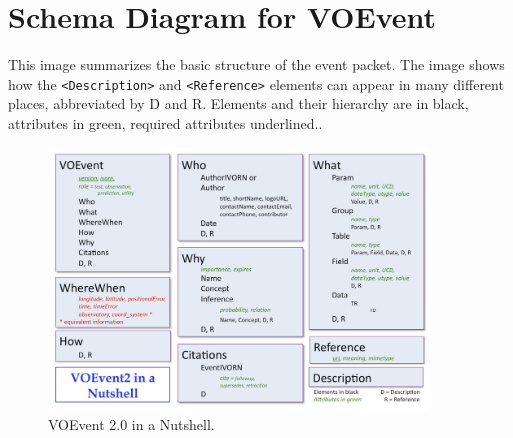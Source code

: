 \documentclass[11pt,a4paper]{ivoa}
\begin{document}
\section{Schema Diagram for VOEvent}
\label{sec:5}
This image summarizes the basic structure of the event packet. The image shows how the {\tt <Description>} and {\tt <Reference>} elements can appear in many different places, abbreviated by D and R. Elements and their hierarchy are in black, attributes in green, required attributes underlined.. 
\begin{figure}[th]
\begin{center}
\includegraphics[width=0.9\textwidth]{nutshell.png} \end{center}
\caption{VOEvent 2.0 in a Nutshell.}
\label{fig:nutshell}
\end{figure}


%
\end{document}
